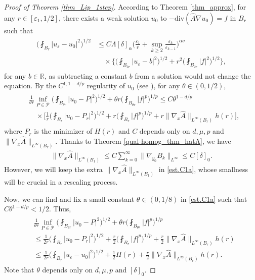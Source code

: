 \documentclass[reqno,12pt]{amsart} %
\theoremstyle{definition}
\theoremstyle{remark}
\numberwithin{equation}{section}
\newcommand{\e}{\varepsilon}
\begin{document}
\begin{proof}[Proof of Theorem \ref{thm_Lip_1step}]
    According to Theorem \ref{thm_approx}, for any $r\in [\varepsilon_1, 1/2]$, there exists a weak solution $u_0$ to $-\mathrm{div}(\widehat{A} \nabla u_0)=f$ in $B_r$ such that
    \begin{align}\label{int-Lip_es_approx}
    \begin{split}
        \bigg(\fint_{B_r}|u_\varepsilon-u_0|^2\bigg)^{1/2}&\leq C\Lambda [\delta]_\alpha\bigg(\frac{\varepsilon_1}{r}+\sup_{k\geq 2}\frac{\e_k}{\e_{k-1}}\bigg)^{\alpha\sigma} \\&\quad\times\bigg\{\bigg(\fint_{B_{2r}}|u_\varepsilon-b|^2\bigg)^{1/2}+r^2\bigg(\fint_{B_{2r}}|f|^2\bigg)^{1/2}\bigg\},
    \end{split}
    \end{align}
    for any $b\in\mathbb{R}$, as subtracting a constant $b$ from a solution would not change the equation. By the $C^{1, 1-d/p}$ regularity of $u_0$ (see \cite{Niu20_reiterated, Niu25_Optimal}), for any $\theta\in(0, 1/2)$, 
    \begin{align}\label{est.C1a}
    \begin{aligned}
        &\frac{1}{\theta r}\inf_{P\in \mathcal{P}}\bigg(\fint_{B_{\theta r}}|u_0-P|^2\bigg)^{1/2}+\theta r\bigg(\fint_{B_{\theta r}}|f|^p\bigg)^{1/p}\leq C\theta^{1-d/p}\\&\quad\times\bigg[\frac{1}{r}\bigg(\fint_{B_{r}}|u_0-P_r|^2\bigg)^{1/2}+r\bigg(\fint_{B_{r}}|f|^p\bigg)^{1/p}+r\|\nabla_x\widehat{A}\|_{L^\infty(B_r)} h(r)\bigg],
    \end{aligned}
    \end{align}
    where $P_r$ is the minimizer of $H(r)$ and $C$ depends only on $d, \mu, p $ and $\|\nabla_x\widehat{A}\|_{L^\infty(B_r)}$.  Thanks to Theorem \ref{qual-homog_thm_hatA}, we have
    \begin{align}\label{est.DAhat}
        \|\nabla_x\widehat{A}\|_{L^\infty(B_1)}\leq C\sum_{k=0}^\infty \|\nabla_{y_0}B_k\|_{L^\infty}\leq C[\delta]_0.
    \end{align} 
    However, we will keep the extra $\|\nabla_x\widehat{A}\|_{L^\infty(B_1)}$ in \eqref{est.C1a}, whose smallness will be crucial in a rescaling process.

    Now, we can find and fix a small constant $\theta\in (0, 1/8)$ in \eqref{est.C1a} such that $C\theta^{1-d/p} < 1/2$. Thus,
    \begin{align}
    \begin{aligned}\label{est.u0-P}
        & \frac{1}{\theta r}\inf_{P\in \mathcal{P}}\bigg(\fint_{B_{\theta r}}|u_0-P|^2\bigg)^{1/2}+\theta r\bigg(\fint_{B_{\theta r}}|f|^p\bigg)^{1/p}\\
        &\leq \frac{1}{2r}\bigg(\fint_{B_{r}}|u_0-P_r|^2\bigg)^{1/2}+\frac{r}{2}\bigg(\fint_{B_{r}}|f|^p\bigg)^{1/p}+\frac{r}{2}\|\nabla_x\widehat{A}\|_{L^\infty(B_r)} h(r)\\
        &\leq \frac{1}{2r}\bigg(\fint_{B_{r}}|u_\varepsilon-u_0|^2\bigg)^{1/2}+\frac{1}{2}H(r)+\frac{r}{2}\|\nabla_x\widehat{A}\|_{L^\infty(B_r)} h(r).
    \end{aligned}
    \end{align}
    Note that $\theta$ depends only on $d, \mu, p$ and $[\delta]_0$. 
    

\end{proof}
\end{document}
